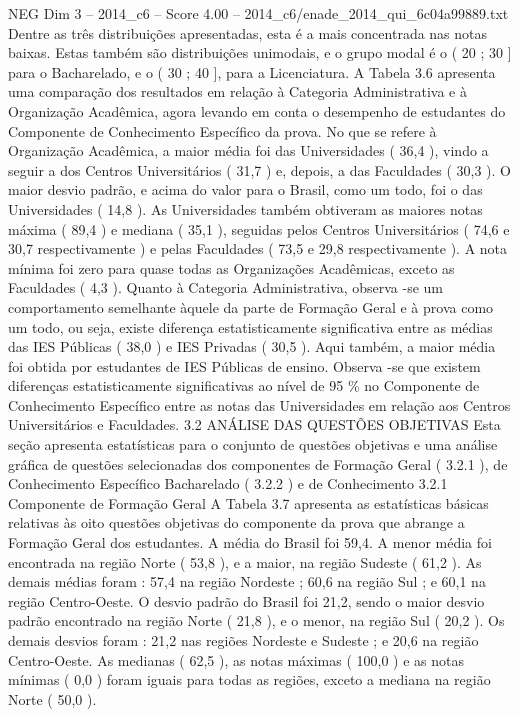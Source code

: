 \begin{textsample}{NEG Dim 3 – 2014\_c6 – Score 4.00 – 2014\_c6/enade\_2014\_qui\_6c04a99889.txt}
Dentre as três distribuições apresentadas, esta é a mais concentrada nas notas baixas.
Estas também são distribuições unimodais, e o grupo modal é o ( 20 ; 30 ] para o Bacharelado, e o ( 30 ; 40 ], para a Licenciatura.
A Tabela 3.6 apresenta uma comparação dos resultados em relação à Categoria Administrativa e à Organização Acadêmica, agora levando em conta o desempenho de estudantes do Componente de Conhecimento Específico da prova.
No que se refere à Organização Acadêmica, a maior média foi das Universidades ( 36,4 ), vindo a seguir a dos Centros Universitários ( 31,7 ) e, depois, a das Faculdades ( 30,3 ).
O maior desvio padrão, e acima do valor para o Brasil, como um todo, foi o das Universidades ( 14,8 ).
As Universidades também obtiveram as maiores notas máxima ( 89,4 ) e mediana ( 35,1 ), seguidas pelos Centros Universitários ( 74,6 e 30,7 respectivamente ) e pelas Faculdades ( 73,5 e 29,8 respectivamente ).
A nota mínima foi zero para quase todas as Organizações Acadêmicas, exceto as Faculdades ( 4,3 ).
Quanto à Categoria Administrativa, observa -se um comportamento semelhante àquele da parte de Formação Geral e à prova como um todo, ou seja, existe diferença estatisticamente significativa entre as médias das IES Públicas ( 38,0 ) e IES Privadas ( 30,5 ).
Aqui também, a maior média foi obtida por estudantes de IES Públicas de ensino.
Observa -se que existem diferenças estatisticamente significativas ao nível de 95 \% no Componente de Conhecimento Específico entre as notas das Universidades em relação aos Centros Universitários e Faculdades. 3.2 ANÁLISE DAS QUESTÕES OBJETIVAS Esta seção apresenta estatísticas para o conjunto de questões objetivas e uma análise gráfica de questões selecionadas dos componentes de Formação Geral ( 3.2.1 ), de Conhecimento Específico Bacharelado ( 3.2.2 ) e de Conhecimento 3.2.1 Componente de Formação Geral A Tabela 3.7 apresenta as estatísticas básicas relativas às oito questões objetivas do componente da prova que abrange a Formação Geral dos estudantes.
A média do Brasil foi 59,4.
A menor média foi encontrada na região Norte ( 53,8 ), e a maior, na região Sudeste ( 61,2 ).
As demais médias foram : 57,4 na região Nordeste ; 60,6 na região Sul ; e 60,1 na região Centro-Oeste.
O desvio padrão do Brasil foi 21,2, sendo o maior desvio padrão encontrado na região Norte ( 21,8 ), e o menor, na região Sul ( 20,2 ).
Os demais desvios foram : 21,2 nas regiões Nordeste e Sudeste ; e 20,6 na região Centro-Oeste.
As medianas ( 62,5 ), as notas máximas ( 100,0 ) e as notas mínimas ( 0,0 ) foram iguais para todas as regiões, exceto a mediana na região Norte ( 50,0 ).

\end{textsample}

